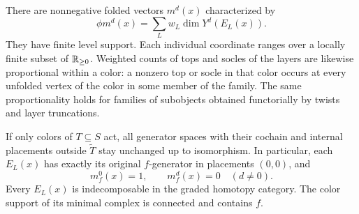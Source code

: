 \begin{proposition}
\label{cat:family}
There are nonnegative folded vectors $m^d(x)$ characterized by
\begin{equation}
 \phi m^d(x)=\sum_Lw_L\dim Y^d(E_L(x)).
 \label{cat:folded-counts}
\end{equation}
They have finite level support.  Each individual coordinate ranges
over a locally finite subset of $\mathbb R_{\geq0}$.  Weighted counts of
tops and socles of the layers are likewise proportional within a
color: a nonzero top or socle in that color occurs at every
unfolded vertex of the color in some member of the family.
The same proportionality holds for families of subobjects obtained
functorially by twists and layer truncations.

If only colors of $T\subseteq S$ act, all generator spaces with
their cochain and internal placements outside $\widetilde T$ stay
unchanged up to isomorphism.  In particular, each $E_L(x)$ has
exactly its original $f$-generator in placements $(0,0)$, and
\[
 m_f^0(x)=1,\qquad m_f^d(x)=0\quad(d\ne0).
\]
Every $E_L(x)$ is indecomposable in the graded homotopy category.
The color support of its minimal complex is connected and contains
$f$.
\end{proposition}


